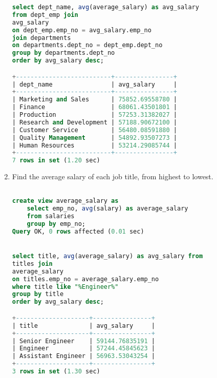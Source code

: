\documentclass[12pt]{article}
\begin{document}
\begin{enumerate}
\begin{lstlisting}[language=SQL]
select dept_name, avg(average_salary) as avg_salary
from dept_emp join
avg_salary
on dept_emp.emp_no = avg_salary.emp_no
join departments
on departments.dept_no = dept_emp.dept_no
group by departments.dept_no
order by avg_salary desc;

+--------------------------+----------------+
| dept_name                | avg_salary     |
+--------------------------+----------------+
| Marketing and Sales      | 75852.69558780 |
| Finance                  | 68061.43501801 |
| Production               | 57253.31382027 |
| Research and Development | 57188.90672100 |
| Customer Service         | 56480.08591880 |
| Quality Management       | 54892.93507273 |
| Human Resources          | 53214.29085744 |
+--------------------------+----------------+
7 rows in set (1.20 sec)

\end{lstlisting}


\item Find the average salary of each job title, from highest to lowest.

\begin{lstlisting}[language=SQL]

create view average_salary as
	select emp_no, avg(salary) as average_salary
	from salaries 
	group by emp_no;
Query OK, 0 rows affected (0.01 sec)


select title, avg(average_salary) as avg_salary from
titles join
average_salary
on titles.emp_no = average_salary.emp_no
where title like "%Engineer%"
group by title
order by avg_salary desc;

+--------------------+----------------+
| title              | avg_salary     |
+--------------------+----------------+
| Senior Engineer    | 59144.76835191 |
| Engineer           | 57244.45845623 |
| Assistant Engineer | 56963.53043254 |
+--------------------+----------------+
3 rows in set (1.30 sec)



\end{lstlisting}






\end{enumerate}



 
\end{document}
